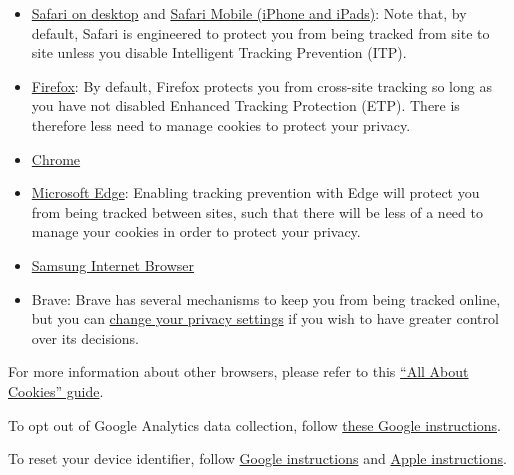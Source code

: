 \begin{itemize}
\item
  \href{https://support.apple.com/guide/safari/manage-cookies-and-website-data-sfri11471/mac}{Safari
  on desktop} and \href{https://support.apple.com/en-us/HT201265}{Safari
  Mobile (iPhone and iPads)}: Note that, by default, Safari is
  engineered to protect you from being tracked from site to site unless
  you disable Intelligent Tracking Prevention (ITP).
\item
  \href{https://support.mozilla.org/en-US/kb/clear-cookies-and-site-data-firefox?redirectlocale=en-US\&redirectslug=delete-cookies-remove-info-websites-stored}{Firefox}:
  By default, Firefox protects you from cross-site tracking so long as
  you have not disabled Enhanced Tracking Protection (ETP). There is
  therefore less need to manage cookies to protect your privacy.
\item
  \href{https://support.google.com/chrome/answer/95647?hl=en}{Chrome}
\item
  \href{https://support.microsoft.com/en-us/help/4468242/microsoft-edge-browsing-data-and-privacy-microsoft-privacy}{Microsoft
  Edge}: Enabling tracking prevention with Edge will protect you from
  being tracked between sites, such that there will be less of a need to
  manage your cookies in order to protect your privacy.
\item
  \href{https://aboutdevice.com/clear-cookies-history-cache-on-samsung-internet-browser-android/}{Samsung
  Internet Browser}
\item
  Brave: Brave has several mechanisms to keep you from being tracked
  online, but you can
  \href{https://support.brave.com/hc/en-us/articles/360017989132-How-do-I-change-my-Privacy-Settings-}{change
  your privacy settings} if you wish to have greater control over its
  decisions.
\end{itemize}

For more information about other browsers, please refer to this
\href{https://www.allaboutcookies.org/manage-cookies/}{``All About
Cookies'' guide}.

To opt out of Google Analytics data collection, follow
\href{https://tools.google.com/dlpage/gaoptout}{these Google
instructions}.

To reset your device identifier, follow
\href{https://support.google.com/googleplay/android-developer/answer/6048248?hl=en}{Google
instructions} and \href{https://support.apple.com/en-us/HT205223}{Apple
instructions}.

